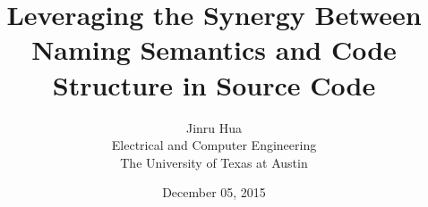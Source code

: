 \documentclass[12pt]{article}
\begin{document}
\title{Leveraging the Synergy Between Naming Semantics and Code Structure in Source Code}

\author{Jinru Hua \\
        Electrical and Computer Engineering  \\
The University of Texas at Austin}  
\date{December 05, 2015}

\maketitle















\end{document}
